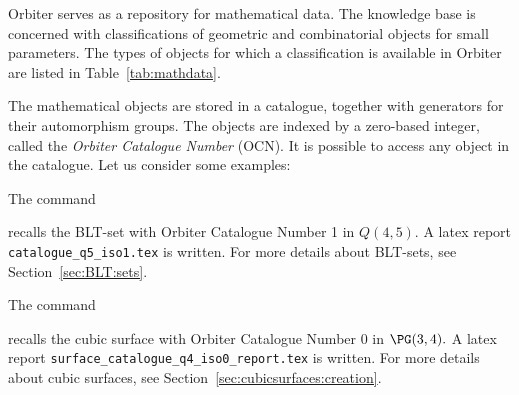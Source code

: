 Orbiter serves as a repository for mathematical data. 
The knowledge base is concerned with classifications of 
geometric and combinatorial objects for small parameters.
The types of objects for which a classification 
is available in Orbiter are listed in Table~\ref{tab:mathdata}. 



The mathematical objects are stored in a catalogue, 
together with generators for their automorphism groups. 
The objects are indexed by a zero-based integer, 
called the {\em Orbiter Catalogue Number} (OCN).
It is possible to access any object in the catalogue. 
Let us consider some examples:

\bigskip


The command 


recalls the BLT-set with Orbiter Catalogue Number 1 in $Q(4,5).$
A latex report \verb'catalogue_q5_iso1.tex' is written. 
For more details about BLT-sets, see Section~\ref{sec:BLT:sets}.

\bigskip

The command 


recalls the cubic surface with Orbiter Catalogue Number 0 in $\PG(3,4).$
A latex report \verb'surface_catalogue_q4_iso0_report.tex' is written. 
For more details about cubic surfaces, 
see Section~\ref{sec:cubicsurfaces:creation}.


\bigskip


